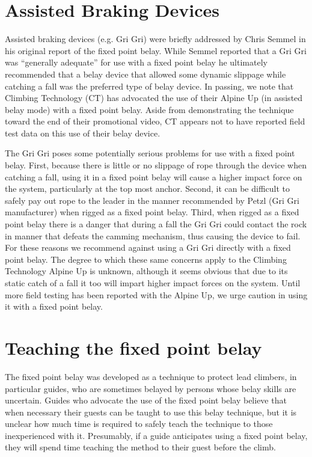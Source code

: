 \documentclass[nonacm,acmtog]{acmart}
\begin{document}
\section{Assisted Braking Devices}
Assisted braking devices (e.g. Gri Gri) were briefly addressed by Chris Semmel
in his original report of the fixed point belay. While Semmel reported that a
Gri Gri was “generally adequate” for use with a fixed point belay he ultimately
recommended that a belay device that allowed some dynamic slippage while
catching a fall was the preferred type of belay device. In passing, we note
that Climbing Technology (CT) has advocated the use of their Alpine Up (in
assisted belay mode) with a fixed point belay. Aside from demonstrating the
technique toward the end of their promotional video, CT appears not to have
reported field test data on this use of their belay device.

The Gri Gri poses some potentially  serious problems for use with a fixed point
belay. First, because there is little or no slippage of rope through the device
when catching a fall, using it in a fixed point belay will cause a higher
impact force on the system, particularly at the top most anchor. Second, it can
be difficult to safely pay out rope to the leader in the manner recommended by
Petzl (Gri Gri manufacturer) when rigged as a fixed point belay. Third, when
rigged as a fixed point belay there is a danger that during a fall the Gri Gri
could contact the rock in manner that defeats the camming mechanism, thus
causing the device to fail. For these reasons we recommend against using a Gri
Gri directly with a fixed point belay. The degree to which these same concerns
apply to the Climbing Technology Alpine Up is unknown, although it seems
obvious that due to its static catch of a fall it too will impart higher impact
forces on the system. Until more field testing has been reported with the
Alpine Up, we urge caution in using it with a fixed point belay.

\section{Teaching the fixed point belay}
The fixed point belay was developed as a technique to protect lead climbers, in
particular guides,  who are sometimes belayed by persons whose belay skills are
uncertain. Guides who advocate the use of the fixed point belay believe that
when necessary their guests can be taught to use this belay technique, but it
is unclear how much time is required to safely teach the technique to those
inexperienced with it. Presumably, if a guide anticipates using a fixed point
belay, they will spend time teaching the method to their guest before the
climb.
\end{document}
